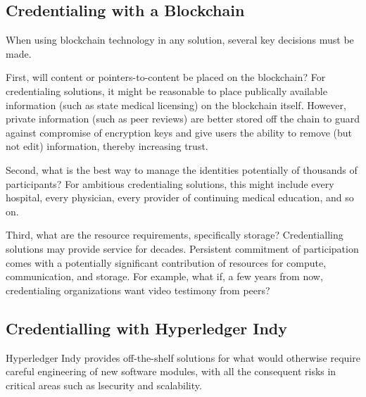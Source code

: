 \subsection{Credentialing with a Blockchain}

When using blockchain technology in any solution, several key decisions must be made.

First, will content or pointers-to-content be placed on the blockchain?  For credentialing
solutions, it might be reasonable to place publically available information (such as state medical
licensing) on the blockchain itself.  However, private information (such as peer reviews) are better
stored off the chain to guard against compromise of encryption keys and give users the ability to
remove (but not edit) information, thereby increasing trust.

Second, what is the best way to manage the identities potentially of thousands of participants?  For
ambitious credentialing solutions, this might include every hospital, every physician, every
provider of continuing medical education, and so on.

Third, what are the resource requirements, specifically storage? Credentialling solutions may
provide service for decades. Persistent commitment of participation comes with a potentially
significant contribution of resources for compute, communication, and storage. For example, what if,
a few years from now, credentialing organizations want video testimony from peers?

\subsection{Credentialling with Hyperledger Indy}

Hyperledger Indy provides off-the-shelf solutions for what would otherwise require careful
engineering of new software modules, with all the consequent risks in critical areas such as
lsecurity and scalability.




